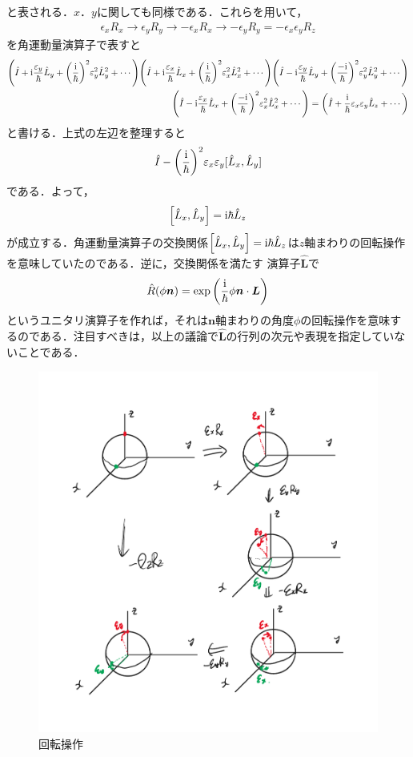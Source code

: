 \documentclass{report}
\begin{document}
  と表される．$x$．$y$に関しても同様である．これらを用いて，
  \begin{align}
    \epsilon_xR_x \to \epsilon_y R_y \to -\epsilon_x R_x \to -\epsilon_yR_y = -\epsilon_x\epsilon_y R_z
  \end{align}
  を角運動量演算子で表すと
  \begin{align}
    \qty(\hat{I} + \mathrm{i}\frac{\varepsilon_y}{\hbar}\hat{L}_y + \qty(\frac{\mathrm{i}}{\hbar})^2\varepsilon_y^2 \hat{L}_y^2 + \cdots) \qty(\hat{I} + \mathrm{i}\frac{\varepsilon_x}{\hbar}\hat{L}_x + \qty(\frac{\mathrm{i}}{\hbar})^2\varepsilon_x^2 \hat{L}_x^2 + \cdots) \qty(\hat{I} - \mathrm{i}\frac{\varepsilon_y}{\hbar}\hat{L}_y + \qty(\frac{-\mathrm{i}}{\hbar})^2\varepsilon_y^2 \hat{L}_y^2 + \cdots)\\ \qty(\hat{I} - \mathrm{i}\frac{\varepsilon_x}{\hbar}\hat{L}_x + \qty(\frac{-\mathrm{i}}{\hbar})^2\varepsilon_x^2 \hat{L}_x^2 + \cdots)
    =\qty(\hat{I} + \frac{\mathrm{i}}{\hbar}\varepsilon_x\varepsilon_y \hat{L}_z + \cdots)
  \end{align}
  と書ける．上式の左辺を整理すると
  \begin{align}
    \hat{I} - \qty(\frac{\mathrm{i}}{\hbar})^2\varepsilon_x\varepsilon_y[\hat{L}_x, \hat{L}_y]
  \end{align}
  である．よって，
  \begin{align}
    \qty[\hat{L}_x, \hat{L}_y] = \mathrm{i}\hbar\hat{L}_z
  \end{align}
  が成立する．角運動量演算子の交換関係$\qty[\hat{L}_x, \hat{L}_y] = \mathrm{i}\hbar\hat{L}_z$は$z$軸まわりの回転操作を意味していたのである．逆に，交換関係を満たす
  演算子$\hat{\bm{L}}$で
  \begin{align}
    \hat{R}(\phi\bm{n}) = \exp\qty(\frac{\mathrm{i}}{\hbar}\phi\bm{n}\cdot\bm{L})
  \end{align}
  というユニタリ演算子を作れば，それは$\bm{n}$軸まわりの角度$\phi$の回転操作を意味するのである．注目すべきは，以上の議論で$\hat{\bm{L}}$の行列の次元や表現を指定していないことである．

  \begin{figure}[H]
    \centering
    \includegraphics[width=0.8\columnwidth]{fig/rotation.pdf}
    \caption{回転操作}
    \label{rotation-image}
  \end{figure}
\end{document}
